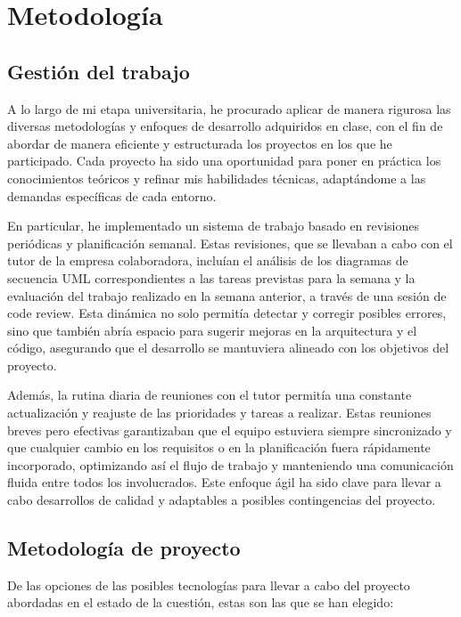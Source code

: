 \documentclass[draft]{scrbook}
\begin{document}
    
\chapter{Metodología} \label{metodologia}

\section{ Gestión del trabajo }

A lo largo de mi etapa universitaria, he procurado aplicar de manera rigurosa las diversas metodologías y enfoques de desarrollo adquiridos en clase, con el fin de abordar de manera eficiente y estructurada los proyectos en los que he participado. Cada proyecto ha sido una oportunidad para poner en práctica los conocimientos teóricos y refinar mis habilidades técnicas, adaptándome a las demandas específicas de cada entorno.

En particular, he implementado un sistema de trabajo basado en revisiones periódicas y planificación semanal. Estas revisiones, que se llevaban a cabo con el tutor de la empresa colaboradora, incluían el análisis de los diagramas de secuencia UML correspondientes a las tareas previstas para la semana y la evaluación del trabajo realizado en la semana anterior, a través de una sesión de code review. Esta dinámica no solo permitía detectar y corregir posibles errores, sino que también abría espacio para sugerir mejoras en la arquitectura y el código, asegurando que el desarrollo se mantuviera alineado con los objetivos del proyecto.

Además, la rutina diaria de reuniones con el tutor permitía una constante actualización y reajuste de las prioridades y tareas a realizar. Estas reuniones breves pero efectivas garantizaban que el equipo estuviera siempre sincronizado y que cualquier cambio en los requisitos o en la planificación fuera rápidamente incorporado, optimizando así el flujo de trabajo y manteniendo una comunicación fluida entre todos los involucrados. Este enfoque ágil ha sido clave para llevar a cabo desarrollos de calidad y adaptables a posibles contingencias del proyecto.

\section{ Metodología de proyecto }

De las opciones de las posibles tecnologías para llevar a cabo del proyecto abordadas en el estado de la cuestión, estas son las que se han elegido:
\end{document}
